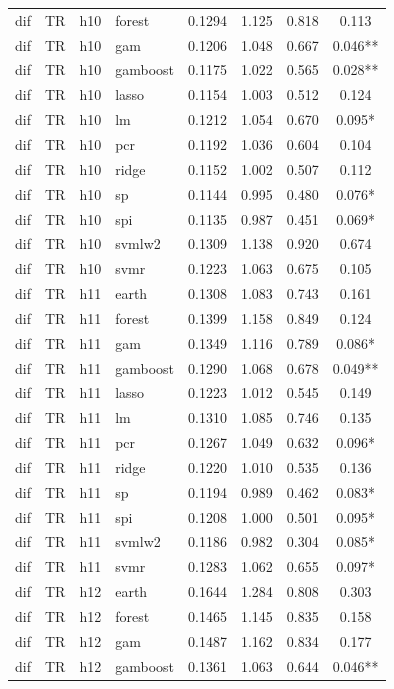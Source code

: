 \begin{ThreePartTable}
\begin{longtable}[t]{llclcccc}
dif & TR & h10 & forest & 0.1294 & 1.125 & 0.818 & 0.113\\
dif & TR & h10 & gam & 0.1206 & 1.048 & 0.667 & 0.046**\\
dif & TR & h10 & gamboost & 0.1175 & 1.022 & 0.565 & 0.028**\\
dif & TR & h10 & lasso & 0.1154 & 1.003 & 0.512 & 0.124\\
dif & TR & h10 & lm & 0.1212 & 1.054 & 0.670 & 0.095*\\
dif & TR & h10 & pcr & 0.1192 & 1.036 & 0.604 & 0.104\\
dif & TR & h10 & ridge & 0.1152 & 1.002 & 0.507 & 0.112\\
dif & TR & h10 & sp & 0.1144 & 0.995 & 0.480 & 0.076*\\
dif & TR & h10 & spi & 0.1135 & 0.987 & 0.451 & 0.069*\\
dif & TR & h10 & svmlw2 & 0.1309 & 1.138 & 0.920 & 0.674\\
dif & TR & h10 & svmr & 0.1223 & 1.063 & 0.675 & 0.105\\
\addlinespace
dif & TR & h11 & earth & 0.1308 & 1.083 & 0.743 & 0.161\\
dif & TR & h11 & forest & 0.1399 & 1.158 & 0.849 & 0.124\\
dif & TR & h11 & gam & 0.1349 & 1.116 & 0.789 & 0.086*\\
dif & TR & h11 & gamboost & 0.1290 & 1.068 & 0.678 & 0.049**\\
dif & TR & h11 & lasso & 0.1223 & 1.012 & 0.545 & 0.149\\
dif & TR & h11 & lm & 0.1310 & 1.085 & 0.746 & 0.135\\
dif & TR & h11 & pcr & 0.1267 & 1.049 & 0.632 & 0.096*\\
dif & TR & h11 & ridge & 0.1220 & 1.010 & 0.535 & 0.136\\
dif & TR & h11 & sp & 0.1194 & 0.989 & 0.462 & 0.083*\\
dif & TR & h11 & spi & 0.1208 & 1.000 & 0.501 & 0.095*\\
dif & TR & h11 & svmlw2 & 0.1186 & 0.982 & 0.304 & 0.085*\\
dif & TR & h11 & svmr & 0.1283 & 1.062 & 0.655 & 0.097*\\
\addlinespace
dif & TR & h12 & earth & 0.1644 & 1.284 & 0.808 & 0.303\\
dif & TR & h12 & forest & 0.1465 & 1.145 & 0.835 & 0.158\\
dif & TR & h12 & gam & 0.1487 & 1.162 & 0.834 & 0.177\\
dif & TR & h12 & gamboost & 0.1361 & 1.063 & 0.644 & 0.046**\\

\end{longtable}
\end{ThreePartTable}

